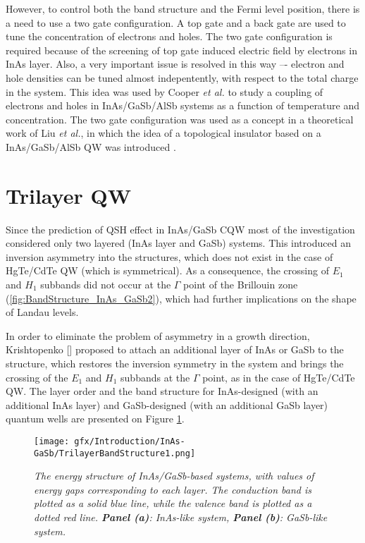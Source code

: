 \documentclass[titlepage,a4paper]{book}
\newcommand{\wciecie}{\quad\phantom{v}}
\begin{document}
However, to control both the band structure and the Fermi level position, there is a need to use a two gate configuration. A top gate and a back gate are used to tune the concentration of electrons and holes. The two gate configuration is required because of the screening of top gate induced electric field by electrons in InAs layer. Also, a very important issue is resolved in this way –- electron and hole densities can be tuned almost indepentently, with respect to the total charge in the system. This idea was used by Cooper \textit{et al.} \cite{Cooper_ElectricField} to study a coupling of electrons and holes in InAs/GaSb/AlSb systems as a function of temperature and concentration. The two gate configuration was used as a concept in a theoretical work of Liu \textit{et al.}, in which the idea of a topological insulator based on a InAs/GaSb/AlSb QW was introduced \cite{Liu_Topology}.

\section{Trilayer QW}
\wciecie
Since the prediction of QSH effect in InAs/GaSb CQW most of the investigation considered only two layered (InAs layer and GaSb) systems. This introduced an inversion asymmetry into the structures, which does not exist in the case of HgTe/CdTe QW (which is symmetrical). As a consequence, the crossing of $E_1$ and $H_1$ subbands did not occur at the $\Gamma$ point of the Brillouin zone \cite{Murakami_Trilayer} (\ref{fig:BandStructure_InAs_GaSb2}), which had further implications on the shape of Landau levels.

In order to eliminate the problem of asymmetry in a growth direction, Krishtopenko [] proposed to attach an additional layer of InAs or GaSb to the structure, which restores the inversion symmetry in the system and brings the crossing of the $E_1$ and $H_1$ subbands at the $\Gamma$ point, as in the case of HgTe/CdTe QW. The layer order and the band structure for InAs-designed (with an additional InAs layer) and GaSb-designed (with an additional GaSb layer) quantum wells are presented on Figure \ref{fig:TrilayerBandStructure1}.

\begin{figure}[ht]
	\centering
	\texttt{[image: gfx/Introduction/InAs-GaSb/TrilayerBandStructure1.png]}
	\vspace{-10pt}
	\caption{\textit{The energy structure of InAs/GaSb-based systems, with values of energy gaps corresponding to each layer. The conduction band is plotted as a solid blue line, while the valence band is plotted as a dotted red line. \textbf{Panel (a)}: InAs-like system, \textbf{Panel (b)}: GaSb-like system.}}
	\label{fig:TrilayerBandStructure1}
\end{figure} 
\end{document}
